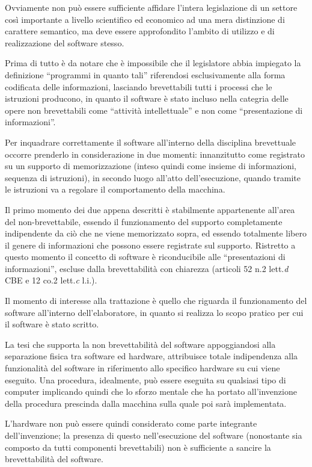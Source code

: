 Ovviamente non può essere sufficiente affidare l'intera legislazione di un settore così importante a livello scientifico ed economico ad una mera distinzione di carattere semantico, ma deve essere approfondito l'ambito di utilizzo e di realizzazione del software stesso.

Prima di tutto è da notare che è impossibile che il legislatore abbia impiegato la definizione ``programmi in quanto tali'' riferendosi esclusivamente alla forma codificata delle informazioni, lasciando brevettabili tutti i processi che le istruzioni producono, in quanto il software è stato incluso nella categria delle opere non brevettabili come ``attività intellettuale'' e non come ``presentazione di informazioni''.

Per inquadrare correttamente il software all'interno della disciplina brevettuale occorre prenderlo in considerazione in due momenti: innanzitutto come registrato su un supporto di memorizzazione (inteso quindi come insieme di informazioni, sequenza di istruzioni), in secondo luogo all'atto dell'esecuzione, quando tramite le istruzioni va a regolare il comportamento della macchina. 

Il primo momento dei due appena descritti è stabilmente appartenente all'area del non-brevettabile, essendo il funzionamento del supporto completamente indipendente da ciò che ne viene memorizzato sopra, ed essendo totalmente libero il genere di informazioni che possono essere registrate sul supporto. Ristretto a questo momento il concetto di software è riconducibile alle ``presentazioni di informazioni'', escluse dalla brevettabilità con chiarezza (articoli 52 n.2 lett.\textit{d} CBE e 12 co.2 lett.\textit{c} l.i.).

Il momento di interesse alla trattazione è quello che riguarda il funzionamento del software all'interno dell'elaboratore, in quanto si realizza lo scopo pratico per cui il software è stato scritto.

La tesi che supporta la non brevettabilità del software appoggiandosi alla separazione fisica tra software ed hardware, attribuisce totale indipendenza alla funzionalità del software in riferimento allo specifico hardware su cui viene eseguito. Una procedura, idealmente, può essere eseguita su qualsiasi tipo di computer implicando quindi che lo sforzo mentale che ha portato all'invenzione della procedura prescinda dalla macchina sulla quale poi sarà implementata. 

L'hardware non può essere quindi considerato come parte integrante dell'invenzione; la presenza di questo nell'esecuzione del software (nonostante sia composto da tutti componenti brevettabili) non è sufficiente a sancire la brevettabilità del software. 


